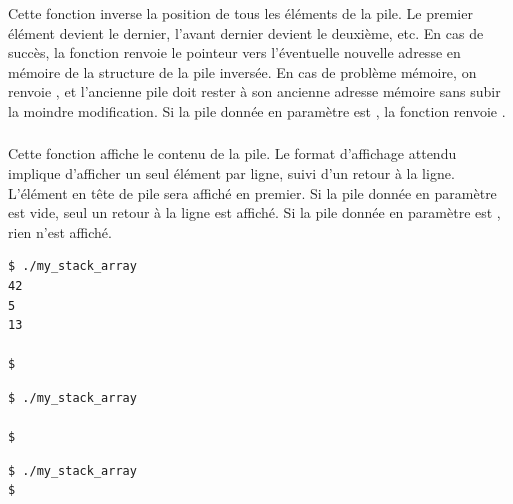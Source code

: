 \subsubsection*{}

\noindent Cette fonction inverse la position de tous les éléments de la pile.
Le premier élément devient le dernier, l'avant dernier devient le deuxième, etc.
En cas de succès, la fonction renvoie le pointeur vers l'éventuelle nouvelle adresse en mémoire de la structure de la pile inversée.
En cas de problème mémoire, on renvoie , et l'ancienne pile doit rester à son ancienne adresse mémoire sans subir la moindre modification.
Si la pile donnée en paramètre est , la fonction renvoie .


\subsubsection*{}

\noindent Cette fonction affiche le contenu de la pile.
Le format d'affichage attendu implique d'afficher un seul élément par ligne, suivi d'un retour à la ligne.
L'élément en tête de pile sera affiché en premier.
Si la pile donnée en paramètre est vide, seul un retour à la ligne est affiché.
Si la pile donnée en paramètre est , rien n'est affiché.

\bigskip

\lstset{language=sh}
\begin{lstlisting}[frame=single,title={Exemple d'affichage du cas normal : pile contenant 42, 5, 13}]
$ ./my_stack_array
42
5
13

$
\end{lstlisting}

\bigskip

\lstset{language=sh}
\begin{lstlisting}[frame=single,title={Exemple d'affichage d'une pile vide}]
$ ./my_stack_array

$
\end{lstlisting}

\bigskip

\lstset{language=sh}
\begin{lstlisting}[frame=single,title={Exemple d'affichage d'un pointeur NULL}]
$ ./my_stack_array
$
\end{lstlisting}
